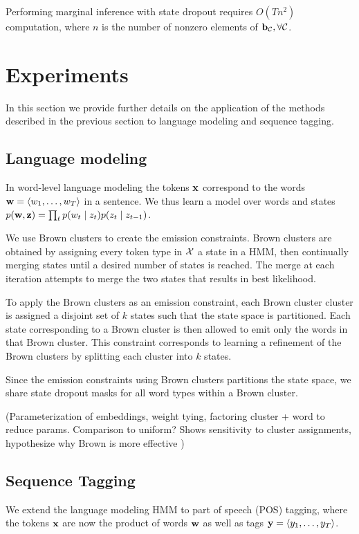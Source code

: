\documentclass[11pt,a4paper]{article}
\begin{document}
Performing marginal inference with state dropout requires $O(Tn^2)$ computation,
where $n$ is the number of nonzero elements of $\mathbf{b}_{\mathcal{C}}, \forall \mathcal{C}$.


\section{Experiments}
In this section we provide further details on the application
of the methods described in the previous section
to language modeling and sequence tagging.

\subsection{Language modeling}
In word-level language modeling the tokens $\mathbf{x}$ correspond to the words
$\mathbf{w} = \langle w_1,\ldots,w_T \rangle$ in a sentence.
We thus learn a model over words and states
$p(\mathbf{w},\mathbf{z}) = \prod_t p(w_t\mid z_t)p(z_t \mid z_{t-1})$.

We use Brown clusters \citep{brown1992} to create the emission constraints.
Brown clusters are obtained by assigning every token type in $\mathcal{X}$ a state in a HMM,
then continually merging states until a desired number of states is reached.
The merge at each iteration attempts to merge the two states that results in best likelihood.

To apply the Brown clusters as an emission constraint,
each Brown cluster cluster is assigned a disjoint set of $k$ states
such that the state space is partitioned.
Each state corresponding to a Brown cluster is then allowed to emit only
the words in that Brown cluster.
This constraint corresponds to learning a refinement of the Brown clusters
by splitting each cluster into $k$ states.

Since the emission constraints using Brown clusters partitions the state space,
we share state dropout masks for all word types within a Brown cluster.

(Parameterization of embeddings,
weight tying,
factoring cluster + word to reduce params.
Comparison to uniform?
Shows sensitivity to cluster assignments, hypothesize why Brown is more effective
)

\subsection{Sequence Tagging}
We extend the language modeling HMM to part of speech (POS) tagging,
where the tokens $\mathbf{x}$ are now the product of words $\mathbf{w}$ as well as tags
$\mathbf{y} = \langle y_1, \ldots, y_T \rangle$.
\end{document}
